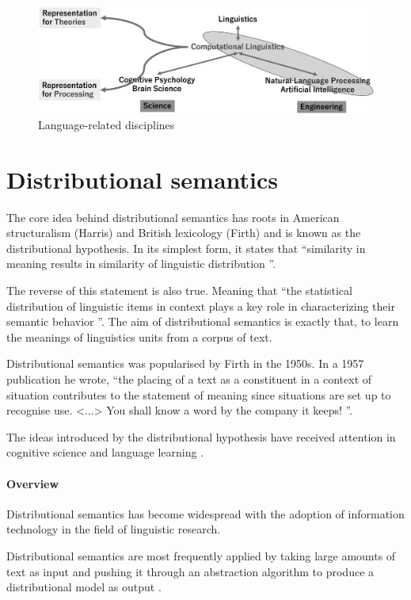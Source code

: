 \documentclass[14pt, a4paper]{extreport}
\begin{document}
\begin{figure}[ht]
\bigskip
\includegraphics[width=14cm]{nlpcl}
\centering
\caption{Language-related disciplines \parencite{nlpandcl}}
\end{figure}


\section{Distributional semantics}

The core idea behind distributional semantics has roots in American structuralism (Harris) and British lexicology (Firth) and is known as the distributional hypothesis. In its simplest form, it states that ``similarity in meaning results in similarity of linguistic distribution \parencite{harris}''.

The reverse of this statement is also true. Meaning that ``the statistical distribution of linguistic items in context plays a key role in characterizing their semantic behavior \parencite{lenci}''. The aim of distributional semantics is exactly that, to learn the meanings of linguistics units from a corpus of text.

Distributional semantics was popularised by Firth in the 1950s. In a 1957 publication he wrote, ``the placing of a text as a constituent in a context of situation contributes to the statement of meaning since situations are set up to recognise use. <...> You shall know a word by the company it keeps! \parencite[11]{firth}''.

The ideas introduced by the distributional hypothesis have received attention in cognitive science \parencite{mcdonald} and language learning \parencite{yarlett}.%

\paragraph{Overview}
Distributional semantics has become widespread with the adoption of information technology in the field of linguistic research.

Distributional semantics are most frequently applied by taking large amounts of text as input and pushing it through an abstraction algorithm to produce a distributional model as output \parencite{emerson}.
\end{document}

